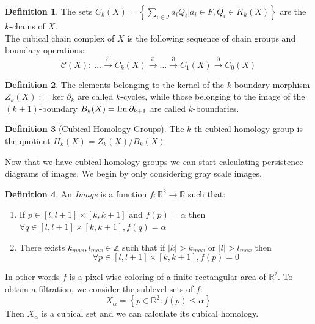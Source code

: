 \documentclass{article}
\newcommand{\R}{\mathbb{R}}
\newcommand{\Z}{\mathbb{Z}}
\newcommand{\img}{\textmd{Im}\:}
\theoremstyle{plain}
\theoremstyle{definition}
\newtheorem{definition}{Definition}[section]
\theoremstyle{remark}
\begin{document}
\begin{definition}
The sets $C_k(X) = \left\{ \sum_{i\in J} a_i Q_i | a_i \in F, Q_i \in K_k(X) \right\}$ are the $k$-chains of $X$. \\
The cubical chain complex of $X$ is the following sequence of chain groups and boundary operations:
\[ \mathcal{C}(X): \ \dots \stackrel{\partial}{\longrightarrow} C_k(X) \stackrel{\partial}{\longrightarrow} \dots \stackrel{\partial}{\longrightarrow} C_1(X) \stackrel{\partial}{\longrightarrow} C_0(X) \]
\end{definition}

\begin{definition}
The elements belonging to the kernel of the $k$-boundary morphism $Z_k(X) := \ker\partial_k$ are called $k$-cycles, while those belonging to the image of the $(k+1)$-boundary $B_k(X) = \img \partial_{k+1}$ are called $k$-boundaries.
\end{definition}

\begin{definition}[Cubical Homology Groups]
The $k$-th cubical homology group is the quotient $ H_k(X)=Z_k(X)/B_k(X) $
\end{definition}

Now that we have cubical homology groups we can start calculating persistence diagrams of images. We begin by only considering gray scale images.
\begin{definition}
An \emph{Image} is a function $f:\R^2 \to \R$ such that:
\begin{enumerate}
    \item If $p \in [l,l+1] \times [k,k+1]$ and $f(p)=\alpha$ then $\forall q \in [l,l+1] \times [k,k+1], f(q)=\alpha$
    \item There exists $k_{max},l_{max} \in \Z$ such that if $|k|>k_{max}$ or $|l|>l_{max}$ then \[\forall p \in [l,l+1] \times [k,k+1], f(p) = 0\]
\end{enumerate}
\end{definition}
In other words $f$ is a pixel wise coloring of a finite rectangular area of $\R^2$.
To obtain a filtration, we consider the sublevel sets of $f$:
\[ X_\alpha = \left\{ p \in \R^2 : f(p)\leq \alpha \right\} \]
Then $X_\alpha$ is a cubical set and we can calculate its cubical homology.
\end{document}
